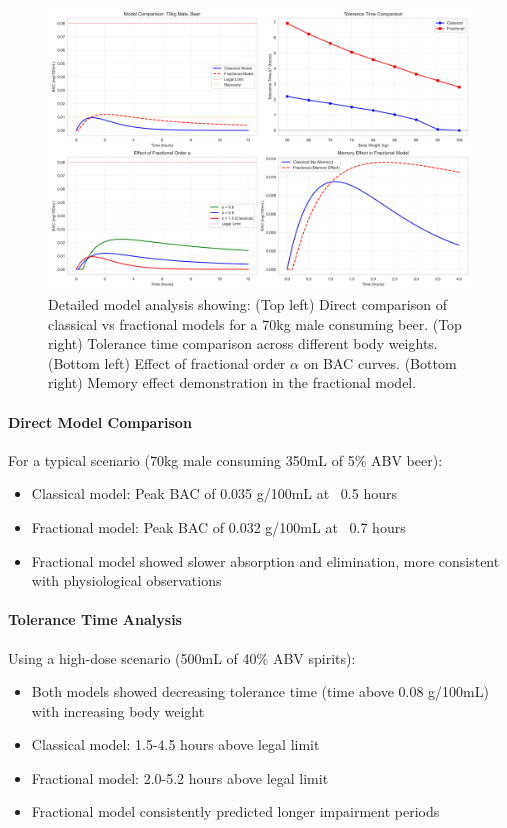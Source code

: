 \documentclass[11pt]{article}
\begin{document}
\begin{figure}[H]
    \centering
    \includegraphics[width=\textwidth]{model_analysis.png}
    \caption{Detailed model analysis showing: (Top left) Direct comparison of classical vs fractional models for a 70kg male consuming beer. (Top right) Tolerance time comparison across different body weights. (Bottom left) Effect of fractional order $\alpha$ on BAC curves. (Bottom right) Memory effect demonstration in the fractional model.}
    \label{fig:model_analysis}
\end{figure}

\paragraph{Direct Model Comparison}
For a typical scenario (70kg male consuming 350mL of 5\% ABV beer):
\begin{itemize}
    \item Classical model: Peak BAC of 0.035 g/100mL at ~0.5 hours
    \item Fractional model: Peak BAC of 0.032 g/100mL at ~0.7 hours
    \item Fractional model showed slower absorption and elimination, more consistent with physiological observations
\end{itemize}

\paragraph{Tolerance Time Analysis}
Using a high-dose scenario (500mL of 40\% ABV spirits):
\begin{itemize}
    \item Both models showed decreasing tolerance time (time above 0.08 g/100mL) with increasing body weight
    \item Classical model: 1.5-4.5 hours above legal limit
    \item Fractional model: 2.0-5.2 hours above legal limit
    \item Fractional model consistently predicted longer impairment periods
\end{itemize}
\end{document}
